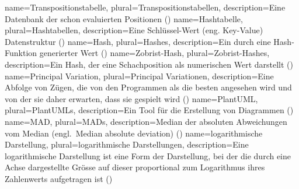 {
    name=Transpositionstabelle,
    plural=Transpositionstabellen,
    description={Eine Datenbank der schon evaluierten Positionen (\cite{transpositiontable})}
}
{
    name=Hashtabelle,
    plural=Hashtabellen,
    description={Eine Schlüssel-Wert (eng. Key-Value) Datenstruktur (\cite{hashtable})}
}
{
    name=Hash,
    plural=Hashes,
    description={Ein durch eine Hash-Funktion generierter Wert (\cite{hash})}
}
{
    name=Zobrist-Hash,
    plural=Zobrist-Hashes,
    description={Ein Hash, der eine Schachposition als numerischen Wert darstellt (\cite{zobristhash})}
}
{
    name=Principal Variation,
    plural=Principal Variationen,
    description={Eine Abfolge von Zügen, die von den Programmen als die besten angesehen wird und von der sie daher erwarten, dass sie gespielt wird (\cite{principalvariation})}
}
{
    name=PlantUML,
    plural=PlantUMLs,
    description={Ein Tool für die Erstellung von Diagrammen (\cite{plantuml})}
}
{
    name=MAD,
    plural=MADs,
    description={Median der absoluten Abweichungen vom Median (engl.\ Median absolute deviation) (\cite{mad})}
}
{
    name=logarithmische Darstellung,
    plural=logarithmische Darstellungen,
    description={Eine logarithmische Darstellung ist eine Form der Darstellung, bei der die durch eine Achse dargestellte Grösse auf dieser proportional zum Logarithmus ihres Zahlenwerts aufgetragen ist (\cite{logskala})}
}